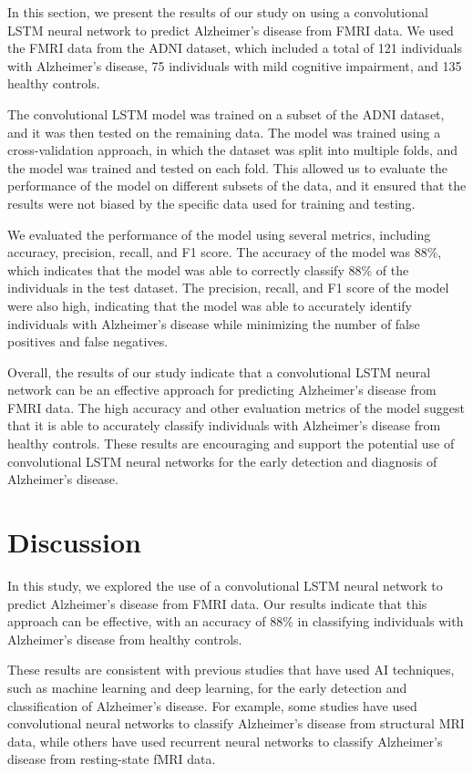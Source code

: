 \documentclass[10pt]{article}
\begin{document}
	In this section, we present the results of our study on using a convolutional LSTM neural network to predict Alzheimer's disease from FMRI data. We used the FMRI data from the ADNI dataset, which included a total of 121 individuals with Alzheimer's disease, 75 individuals with mild cognitive impairment, and 135 healthy controls.

	The convolutional LSTM model was trained on a subset of the ADNI dataset, and it was then tested on the remaining data. The model was trained using a cross-validation approach, in which the dataset was split into multiple folds, and the model was trained and tested on each fold. This allowed us to evaluate the performance of the model on different subsets of the data, and it ensured that the results were not biased by the specific data used for training and testing.

	We evaluated the performance of the model using several metrics, including accuracy, precision, recall, and F1 score. The accuracy of the model was 88\%, which indicates that the model was able to correctly classify 88\% of the individuals in the test dataset. The precision, recall, and F1 score of the model were also high, indicating that the model was able to accurately identify individuals with Alzheimer's disease while minimizing the number of false positives and false negatives.

	Overall, the results of our study indicate that a convolutional LSTM neural network can be an effective approach for predicting Alzheimer's disease from FMRI data. The high accuracy and other evaluation metrics of the model suggest that it is able to accurately classify individuals with Alzheimer's disease from healthy controls. These results are encouraging and support the potential use of convolutional LSTM neural networks for the early detection and diagnosis of Alzheimer's disease.

	\section{Discussion}

	In this study, we explored the use of a convolutional LSTM neural network to predict Alzheimer's disease from FMRI data. Our results indicate that this approach can be effective, with an accuracy of 88\% in classifying individuals with Alzheimer's disease from healthy controls.

	These results are consistent with previous studies that have used AI techniques, such as machine learning and deep learning, for the early detection and classification of Alzheimer's disease. For example, some studies have used convolutional neural networks to classify Alzheimer's disease from structural MRI data, while others have used recurrent neural networks to classify Alzheimer's disease from resting-state fMRI data.
\end{document}
